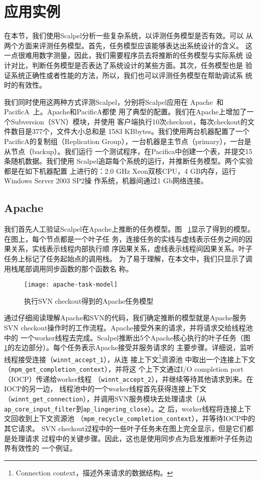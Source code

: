 \section{应用实例}
\label{sec:scp:case}

在本节，我们使用Scalpel分析一些复杂系统，以评测任务模型是否有效。可以
从两个方面来评测任务模型。首先，任务模型应该能够表达出系统设计的含义。
这一点很难用数字测量，因此，我们需要程序员去将推断的任务模型与实际系统
设计对比，判断任务模型是否表达了系统设计的某些方面。其次，任务模型也是
验证系统正确性或者性能的方法，所以，我们也可以评测任务模型在帮助调试系
统时的有效性。

我们同时使用这两种方式评测Scalpel，分别将Scalpel应用在
Apache~\cite{apache}和PacificA~\cite{pacifica}上。Apache和PacificA都使
用了典型的配置。我们在Apache上增加了一个Subversion（SVN）模块，并使用
客户端执行10次checkout，每次checkout的文件数目是377个，文件大小总和是
1583 KBbytes。我们使用两台机器配置了一个PacificA的复制组（Replication
Group），一台机器是主节点（primary），一台是从节点（backup）。我们运行
一个测试程序，在Pacifica中创建一个表，并提交15条随机数据。我们使用
Scalpel追踪每个系统的运行，并推断任务模型。两个实验都是在如下机器配置
上进行的：2.0 GHz Xeon双核CPU，4 GB内存，运行Windows Server 2003 SP2操
作系统，机器间通过1 Gb网络连接。

\subsection{Apache}

我们首先人工验证Scalpel在Apache上推断的任务模型。图~
\ref{fig:apache_model}显示了得到的模型。在图上，每个节点都是一个叶子任
务，连接任务的实线与虚线表示任务之间的因果关系，实线表示线程内部执行顺
序因果关系，虚线表示线程间因果关系。叶子任务上标记了任务起始点的调用栈。
为了易于理解，在本文中，我们只显示了调用栈尾部调用同步函数的那个函数名
称。

\begin{figure}[htbp]
\centering
\texttt{[image: apache-task-model]}
\caption{执行SVN checkout得到的Apache任务模型}
\label{fig:apache_model}
\end{figure}


通过仔细阅读理解Apache和SVN的代码，我们确定推断的模型就是Apache服务SVN
checkout操作时的工作流程。Apache接受外来的请求，并将请求交给线程池中的
一个worker线程去完成。Scalpel推断出5个Apache核心执行的叶子任务（图~
\ref{fig:apache_model}的左边部分）。每个任务表示Apache接受并服务请求的
主要步骤。详细说，监听线程接受连接（\texttt{winnt\_accept\_1}），从连
接上下文\footnote{Connection context，描述外来请求的数据结构。}资源池
中取出一个连接上下文（\texttt{mpm\_get\_completion\_context}），并将这
个上下文通过I/O completion port（IOCP）传递给worker线程
（\texttt{winnt\_accept\_2}），并继续等待其他请求到来。在IOCP的另一边，
线程池中的一个worker线程首先获得连接上下文
（\texttt{winnt\_get\_connection}），并调用SVN服务模块去处理请求（从
\texttt{ap\_core\_input\_filter}到\texttt{ap\_lingering\_close}）。之
后，worker线程将连接上下文回收到上下文资源池
（\texttt{mpm\_recycle\_completion\_context}），并等待IOCP中的其它请求。
SVN checkout过程中的一些叶子任务未在图上完全显示，但是它们都是处理请求
过程中的关键步骤。因此，这也是使用同步点为启发推断叶子任务边界有效性的
一个例证。

